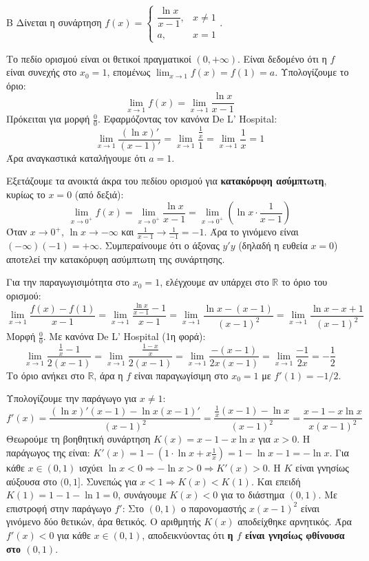 \begin{thema}{Β}
Δίνεται η συνάρτηση $f(x) = \begin{cases} \dfrac{\ln x}{x-1}, & x \ne 1 \\ a, & x=1 \end{cases}$.
\begin{erwthma}
\item Το πεδίο ορισμού είναι οι θετικοί πραγματικοί $(0, +\infty)$. 
Είναι δεδομένο ότι η $f$ είναι συνεχής στο $x_0=1$, επομένως $\lim_{x\to1} f(x) = f(1) = a$.
Υπολογίζουμε το όριο:
\[ \lim_{x\to1} f(x) = \lim_{x\to1} \frac{\ln x}{x-1} \]
Πρόκειται για μορφή $\frac{0}{0}$. Εφαρμόζοντας τον κανόνα De L' Hospital:
\[ \lim_{x\to1} \frac{(\ln x)'}{(x-1)'} = \lim_{x\to1} \frac{\frac{1}{x}}{1} = \lim_{x\to1} \frac{1}{x} = 1 \]
Άρα αναγκαστικά καταλήγουμε ότι $a=1$.

\item Εξετάζουμε τα ανοικτά άκρα του πεδίου ορισμού για \textbf{κατακόρυφη ασύμπτωτη}, κυρίως το $x=0$ (από δεξιά):
\[ \lim_{x\to0^+} f(x) = \lim_{x\to0^+} \frac{\ln x}{x-1} = \lim_{x\to0^+} \left( \ln x \cdot \frac{1}{x-1} \right) \]
Όταν $x\to0^+$, $\ln x \to -\infty$ και $\frac{1}{x-1} \to \frac{1}{-1} = -1$.
Άρα το γινόμενο είναι $(-\infty)(-1) = +\infty$.
Συμπεραίνουμε ότι ο άξονας $y'y$ (δηλαδή η ευθεία $x=0$) αποτελεί την κατακόρυφη ασύμπτωτη της συνάρτησης.

\item Για την παραγωγισιμότητα στο $x_0=1$, ελέγχουμε αν υπάρχει στο $\mathbb{R} $ το όριο του ορισμού:
\[ \lim_{x\to1} \frac{f(x)-f(1)}{x-1} = \lim_{x\to1} \frac{\frac{\ln x}{x-1} - 1}{x-1} = \lim_{x\to1} \frac{\ln x - (x-1)}{(x-1)^2} = \lim_{x\to1} \frac{\ln x - x + 1}{(x-1)^2} \]
Μορφή $\frac{0}{0}$. Με κανόνα De L' Hospital (1η φορά):
\[ \lim_{x\to1} \frac{\frac{1}{x} - 1}{2(x-1)} = \lim_{x\to1} \frac{\frac{1-x}{x}}{2(x-1)} = \lim_{x\to1} \frac{-(x-1)}{2x(x-1)} = \lim_{x\to1} \frac{-1}{2x} = -\frac{1}{2} \]
Το όριο ανήκει στο $\mathbb{R}$, άρα η $f$ είναι παραγωγίσιμη στο $x_0=1$ με $f'(1) = -1/2$.

\item Υπολογίζουμε την παράγωγο για $x \ne 1$:
\[ f'(x) = \frac{(\ln x)'(x-1) - \ln x(x-1)'}{(x-1)^2} = \frac{\frac{1}{x}(x-1) - \ln x}{(x-1)^2} = \frac{x - 1 - x\ln x}{x(x-1)^2} \]
Θεωρούμε τη βοηθητική συνάρτηση $K(x) = x - 1 - x\ln x$ για $x>0$.
Η παράγωγος της είναι: $K'(x) = 1 - (1\cdot\ln x + x\frac{1}{x}) = 1 - \ln x - 1 = -\ln x$.
Για κάθε $x \in (0, 1)$ ισχύει $\ln x < 0 \Rightarrow -\ln x > 0 \Rightarrow K'(x) > 0$.
Η $K$ είναι γνησίως αύξουσα στο $(0, 1]$. Συνεπώς για $x < 1 \Rightarrow K(x) < K(1)$.
Και επειδή $K(1) = 1-1-\ln 1 = 0$, συνάγουμε $K(x) < 0$ για το διάστημα $(0, 1)$.
Με επιστροφή στην παράγωγο $f'$:
Στο $(0, 1)$ ο παρονομαστής $x(x-1)^2$ είναι γινόμενο δύο θετικών, άρα θετικός.
Ο αριθμητής $K(x)$ αποδείχθηκε αρνητικός.
Άρα $f'(x) < 0$ για κάθε $x \in (0, 1)$, αποδεικνύοντας ότι \textbf{η $f$ είναι γνησίως φθίνουσα στο $(0, 1)$}.
\end{erwthma}
\end{thema}

